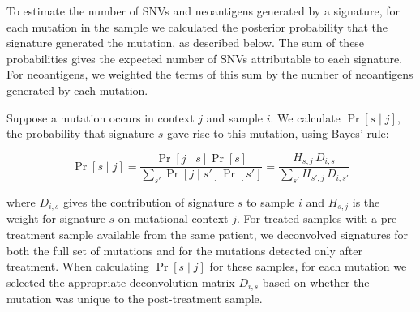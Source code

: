 
To estimate the number of SNVs and neoantigens generated by a signature, for each mutation in the sample we calculated the posterior probability that the signature generated the mutation, as described below. The sum of these probabilities gives the expected number of SNVs attributable to each signature. For neoantigens, we weighted the terms of this sum by the number of neoantigens generated by each mutation.

Suppose a mutation occurs in context $j$ and sample $i$. We calculate $\Pr[s \mid j]$, the probability that signature $s$ gave rise to this mutation, using Bayes' rule:

\[
\Pr[s \mid j] = \frac{\Pr[j \mid s] \Pr[s]}{\sum_{s'}{\Pr[j \mid s']\Pr[s']}} = \frac{H_{s,j} \, D_{i,s}}{\sum_{s'}{H_{s',j} \, D_{i,s'}}}
\]

where $D_{i,s}$ gives the contribution of signature $s$ to sample $i$ and $H_{s,j}$ is the weight for signature $s$ on mutational context $j$. For treated samples with a pre-treatment sample available from the same patient, we deconvolved signatures for both the full set of mutations and for the mutations detected only after treatment. When calculating $\Pr[s \mid j]$ for these samples, for each mutation we selected the appropriate deconvolution matrix $D_{i,s}$ based on whether the mutation was unique to the post-treatment sample.

